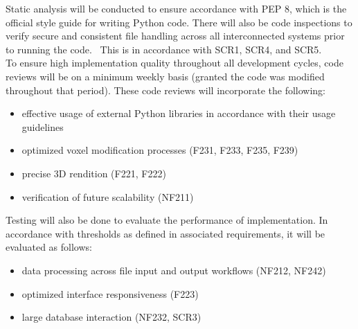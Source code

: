 \documentclass[12pt, titlepage]{article}
\begin{document}
\noindent Static analysis will be conducted to ensure accordance with PEP 8, which is the official style guide for writing Python code. There will also be code inspections to verify secure and consistent file handling across all interconnected systems prior to running the code.  This is in accordance with SCR1, SCR4, and SCR5.\\

\noindent To ensure high implementation quality throughout all development cycles, code reviews will be on a minimum weekly basis (granted the code was modified throughout that period). These code reviews will incorporate the following:
\begin{itemize}
\item effective usage of external Python libraries in accordance with their usage guidelines
\item optimized voxel modification processes (F231, F233, F235, F239)
\item precise 3D rendition (F221, F222)
\item verification of future scalability (NF211)
\end{itemize}

\noindent Testing will also be done to evaluate the performance of implementation. In accordance with thresholds as defined in associated requirements, it will be evaluated as follows:
\begin{itemize}
\item data processing across file input and output workflows (NF212, NF242)
\item optimized interface responsiveness (F223)
\item large database interaction (NF232, SCR3)
\end{itemize}
\end{document}
